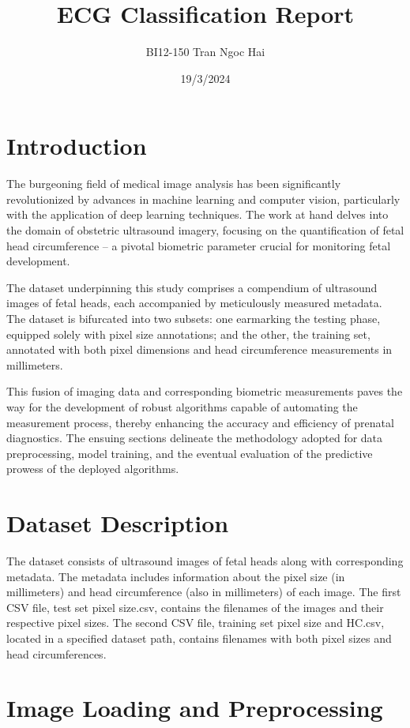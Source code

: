 \documentclass{report}
\title{ECG Classification Report}
\author{BI12-150 Tran Ngoc Hai}
\date{19/3/2024}
\begin{document}

\section{Introduction}
The burgeoning field of medical image analysis has been significantly revolutionized by advances in machine learning and computer vision, particularly with the application of deep learning techniques. The work at hand delves into the domain of obstetric ultrasound imagery, focusing on the quantification of fetal head circumference -- a pivotal biometric parameter crucial for monitoring fetal development.

The dataset underpinning this study comprises a compendium of ultrasound images of fetal heads, each accompanied by meticulously measured metadata. The dataset is bifurcated into two subsets: one earmarking the testing phase, equipped solely with pixel size annotations; and the other, the training set, annotated with both pixel dimensions and head circumference measurements in millimeters.

This fusion of imaging data and corresponding biometric measurements paves the way for the development of robust algorithms capable of automating the measurement process, thereby enhancing the accuracy and efficiency of prenatal diagnostics. The ensuing sections delineate the methodology adopted for data preprocessing, model training, and the eventual evaluation of the predictive prowess of the deployed algorithms.

\section{Dataset Description}
The dataset consists of ultrasound images of fetal heads along with corresponding metadata. The metadata includes information about the pixel size (in millimeters) and head circumference (also in millimeters) of each image. The first CSV file, test set pixel size.csv, contains the filenames of the images and their respective pixel sizes. The second CSV file, training set pixel size and HC.csv, located in a specified dataset path, contains filenames with both pixel sizes and head circumferences.

\section{Image Loading and Preprocessing}
\end{document}

